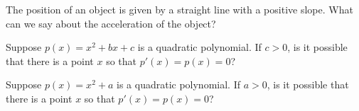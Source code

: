 \documentclass{ximera}
\newcommand{\recommendation}[1]{}
\newcommand{\GoodQuestions}[1]{}
\begin{document}
\begin{shuffle}
\begin{problem}
  The position of an object is given by a straight line with a
  positive slope.  What can we say about the acceleration of the
  object?
  \begin{multipleChoice}
  \end{multipleChoice}
\end{problem}


\begin{problem}
  Suppose $p(x) = x^2 + bx + c$ is a quadratic polynomial.  If $c > 0$, is it possible that there is a point $x$ so that $p'(x) = p(x) = 0$?
  \begin{multipleChoice}
  \end{multipleChoice}
\end{problem}

\begin{problem}
  Suppose $p(x) = x^2 + a$ is a quadratic polynomial.  If $a > 0$, is it possible that there is a point $x$ so that $p'(x) = p(x) = 0$?
  \begin{multipleChoice}
  \end{multipleChoice}
\end{problem}







\end{shuffle}
\end{document}
